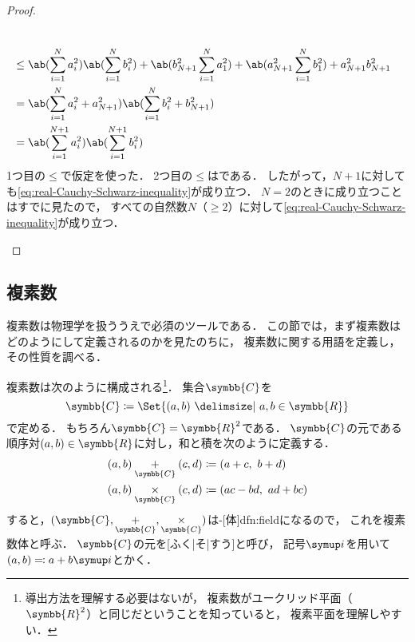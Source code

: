 \documentclass[../sotsu.tex]{subfiles}
\begin{document}
\begin{proof}
\begin{enumerate}
\begin{equation*}
\begin{split}
                    \\
                    &\leq 
                        \ab( \sum_{i = 1}^{N} a_i^2 )
                        \ab( \sum_{i = 1}^{N} b_i^2 )
                        + \ab( b_{N+1}^2 \sum_{i = 1}^{N} a_1^2 )
                        + \ab( a_{N+1}^2 \sum_{i = 1}^{N} b_1^2 )
                        + a_{N+1}^2 b_{N+1}^2
                    \\
                    &=
                        \ab( \sum_{i = 1}^{N} a_i^2 + a_{N+1}^2 )
                        \ab( \sum_{i = 1}^{N} b_i^2 + b_{N+1}^2 )
                    \\
                    &= 
                    \ab( \sum_{i = 1}^{N+1} a_i^2 )
                    \ab( \sum_{i = 1}^{N+1} b_i^2 )
                \end{split}
            \end{equation*}
            1つ目の$\leq$で仮定を使った．
            2つ目の$\leq$はである．
            したがって，$N + 1$に対しても\cref{eq:real-Cauchy-Schwarz-inequality}が成り立つ．
            $N = 2$のときに成り立つことはすでに見たので，
            すべての自然数$N$（$\geq 2$）に対して\cref{eq:real-Cauchy-Schwarz-inequality}が成り立つ．
    \end{enumerate}
\end{proof}






\subsection{複素数}
\label{sec:complex-number-field}

複素数は物理学を扱ううえで必須のツールである．
この節では，まず複素数はどのようにして定義されるのかを見たのちに，
複素数に関する用語を定義し，その性質を調べる．


複素数は次のように構成される\footnote{
    導出方法を理解する必要はないが，
    複素数がユークリッド平面（$\symbb{R}^2$）と同じだということを知っていると，
    複素平面を理解しやすい．
}．
集合$\symbb{C}$を
\begin{equation}
    \symbb{C} \coloneq \Set{  (a, b)  \given  a, b \in \symbb{R}  }
\end{equation}
で定める．
もちろん$\symbb{C} = \symbb{R}^2$である．
$\symbb{C}$の元である順序対$(a, b) \in \symbb{R}$に対し，和と積を次のように定義する．
\begin{align}
    \label{eq:definition-of-sum-of-complex-number}
    (a, b) \underset{\symbb{C}}{+} (c, d) &\coloneq (a+c, \  b+d)  \\
    \label{eq:definition-of-product-of-complex-number}
    (a, b) \underset{\symbb{C}}{\times} (c, d) &\coloneq (ac-bd, \  ad+bc)
\end{align}
すると，$(\symbb{C}, \underset{\symbb{C}}{+}, \underset{\symbb{C}}{\times})$は-[体]{dfn:field}になるので，
これを複素数体と呼ぶ．
$\symbb{C}$の元を[ふく|そ|すう]と呼び，
記号$\iu$を用いて$(a, b) \eqcolon a + b\iu$とかく．
\end{document}
